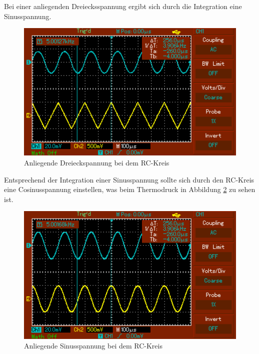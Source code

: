 \newpage
Bei einer anliegenden Dreiecksspannung ergibt sich durch die Integration eine Sinusspannung.
\begin{figure}
  \centering
  \includegraphics{dreieck.pdf}
  \caption{Anliegende Dreieckspannung bei dem RC-Kreis}
  \label{fig:Dreieck}
\end{figure}

\newpage
Entsprechend der Integration einer Sinusspannung sollte sich durch den RC-Kreis eine Cosinusspannung einstellen,
was beim Thermodruck in Abbildung \ref{fig:Sinus} zu sehen ist.
\begin{figure}
  \centering
  \includegraphics{sinus.pdf}
  \caption{Anliegende Sinusspannung bei dem RC-Kreis}
  \label{fig:Sinus}
\end{figure}
